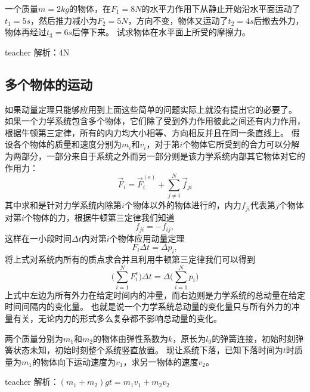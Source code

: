 \begin{example}
一个质量$m=2\unit{kg}$的物体，在$F_1 = 8\unit{N}$的水平力作用下从静止开始沿水平面运动了$t_1 = 5\unit{s}$，然后推力减小为$F_2 = 5\unit{N}$，方向不变，物体又运动了$t_2=4\unit{s}$后撤去外力，物体再经过$t_3 = 6\unit{s}$后停下来。
试求物体在水平面上所受的摩擦力。
\begin{taggedblock}{teacher}
\noindent
解析：4N
\end{taggedblock}
\end{example}




\subsection{多个物体的运动}
如果动量定理只能够应用到上面这些简单的问题实际上就没有提出它的必要了。
如果一个力学系统包含多个物体，它们除了受到外力作用彼此之间还有内力作用，根据牛顿第三定律，所有的内力均大小相等、方向相反并且在同一条直线上。
假设各个物体的质量和速度分别为$m_i$和$v_i$，对于第$i$个物体它所受到的合力可以分解为两部分，一部分来自于系统之外而另一部分则是该力学系统内部其它物体对它的作用力：
\begin{equation}
\vec{F}_i = \vec{F}_i^{(e)}+\sum_{j\neq i}^{N}\vec{f}_{ji}
\end{equation}
其中求和是针对力学系统内除第$i$个物体以外的物体进行的，内力$f_{ji}$代表第$j$个物体对第$i$个物体的力，根据牛顿第三定律我们知道
\begin{equation}
f_{ji} = -f_{ij},
\end{equation}
这样在一小段时间$\Delta t$内对第$i$个物体应用动量定理
\begin{equation}
F_i\Delta t = \Delta p_i,
\end{equation}
将上式对系统内所有的质点求合并且利用牛顿第三定律我们可以得到
\begin{equation}
\big(\sum_{i=1}^{N}F_i^{e}\big) \Delta t = \Delta \big(\sum_{i=1}^{N}p_i\big)
\end{equation}
上式中左边为所有外力在给定时间内的冲量，而右边则是力学系统的总动量在给定时间间隔内的变化量。
也就是说一个力学系统总动量的变化量只与所有外力的冲量有关，无论内力的形式多么复杂都不影响总动量的变化。


\begin{example}
	两个质量分别为$m_1$和$m_2$的物体由弹性系数为$k$，原长为$l_0$的弹簧连接，初始时刻弹簧状态未知，初始时刻整个系统竖直放置。
	现让系统下落，已知下落时间为$t$时质量为$m_1$的物体向下运动速度为$v_1$，求另一物体的速度$v_2$。
	\begin{taggedblock}{teacher}
	\newline
		解析：$(m_1+m_2)gt=m_1v_1+m_2v_2$
	\end{taggedblock}
\end{example}


